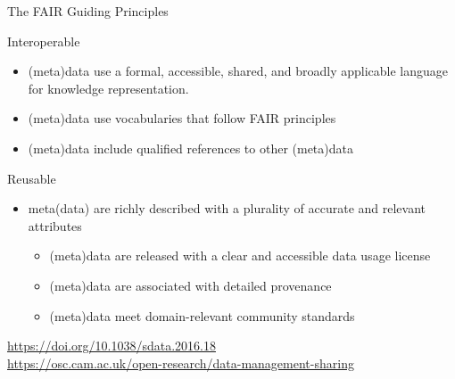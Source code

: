 \documentclass[ignorenonframetext,aspectratio=169,10pt,xcolor=table]{beamer}
\begin{document}
\begin{frame}{The FAIR Guiding Principles}
  \begin{block}{Interoperable}
    \begin{itemize}
    \item (meta)data use a formal, accessible, shared, and broadly applicable language for knowledge representation.
    \item (meta)data use vocabularies that follow FAIR principles
    \item (meta)data include qualified references to other (meta)data
    \end{itemize}
  \end{block}

  \begin{block}{Reusable}
    \begin{itemize}
    \item meta(data) are richly described with a plurality of accurate and relevant attributes
      \begin{itemize}
      \item (meta)data are released with a clear and accessible data usage license
      \item (meta)data are associated with detailed provenance
      \item (meta)data meet domain-relevant community standards
      \end{itemize}
    \end{itemize}
  \end{block}

  \begin{flushright} \tiny
    \url{https://doi.org/10.1038/sdata.2016.18}\\
    \url{https://osc.cam.ac.uk/open-research/data-management-sharing}
  \end{flushright}

\end{frame}
\end{document}
